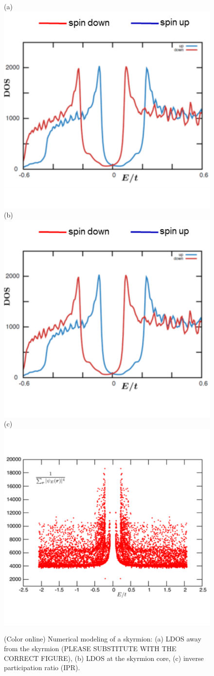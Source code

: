 \documentclass[twocolumn,showpacs,floatfix,nofootinbib,longbibliography]{revtex4-1}
\begin{document}
\begin{figure} \centering
	(a)\includegraphics[width=0.25\linewidth]{numerical-LDOS-away} \hspace{0.1cm}
	(b)\includegraphics[width=0.25\linewidth]{numerical-LDOS-core} \hspace{0.1cm}
	(c)\includegraphics[width=0.25\linewidth]{numerical-IPR} 
\caption{(Color online) Numerical modeling of a skyrmion: (a) LDOS away from the skyrmion (PLEASE SUBSTITUTE WITH THE CORRECT FIGURE), (b) LDOS at the skyrmion core, (c) inverse participation ratio (IPR).} \label{fig:LDOSNumerics}
\end{figure}

\end{document}
